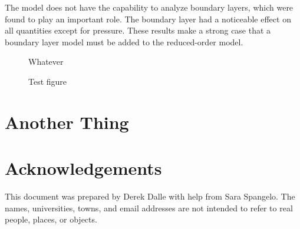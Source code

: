 \documentclass{../aiaa-pretty}
\begin{document}
The model does not have the capability to analyze boundary layers, which were found to play an important role.  The boundary layer had a noticeable effect on all quantities except for pressure.  These results make a strong case that a boundary layer model must be added to the reduced-order model.

\begin{figure}[!h]
\begin{center}
Whatever
\end{center}
\caption{Test figure}
\end{figure}


\appendix
\section{Another Thing}


\section*{Acknowledgements}
This document was prepared by Derek Dalle with help from Sara Spangelo.  The names, universities, towns, and email addresses are not intended to refer to real people, places, or objects.



\end{document}
